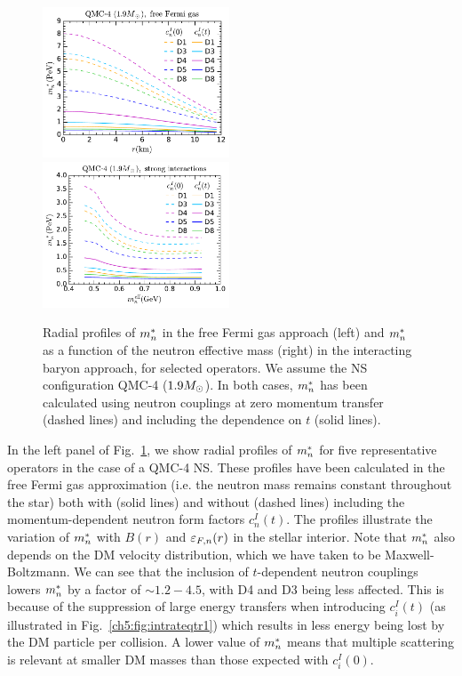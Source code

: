   \begin{figure}[t!bp]
    \centering
\includegraphics[width=0.495\textwidth]{capture_3/mnstar_r_QMC4_free_Fermi.pdf}    
\includegraphics[width=0.495\textwidth]{capture_3/mnstar_mn_QMC4.pdf}
    \caption{Radial profiles of $m_n^*$ in the free Fermi gas approach (left) and $m_n^*$ as a function of the neutron effective mass (right) in the interacting baryon approach, for selected operators. We assume the NS configuration QMC-4 ($1.9M_\odot$). In both cases, $m_n^*$ has been calculated using neutron couplings at zero momentum transfer (dashed lines) and including the dependence on $t$ (solid lines). }
    \label{ch5:fig:mstar}
\end{figure}


In the left panel of Fig.~\ref{ch5:fig:mstar}, we show radial profiles of $m_n^*$ for five representative operators in the case of a QMC-4 NS. These profiles have been calculated in the free Fermi gas approximation (i.e. the neutron mass remains constant throughout the star) both with (solid lines) and without (dashed lines) including the momentum-dependent neutron form factors $c_n^I(t)$. 
The profiles illustrate the variation of $m_n^*$ with $B(r)$ and $\varepsilon_{F,n}(r)$ in the stellar interior. Note that $m_n^*$ also depends on the  DM velocity distribution, which we have taken to be Maxwell-Boltzmann. We can see that the inclusion of $t$-dependent neutron couplings lowers $m_n^*$ by a factor of $\sim 1.2 - 4.5$, with D4 and D3 being less affected. 
This is because of the suppression of large energy transfers when introducing  $c_i^I(t)$ (as illustrated in Fig.~\ref{ch5:fig:intrateqtr1}) which results in less energy being lost by the DM particle per collision.  A lower value of $m_n^*$ means that multiple scattering is relevant at smaller DM masses than those expected with $c_i^I(0)$. 

